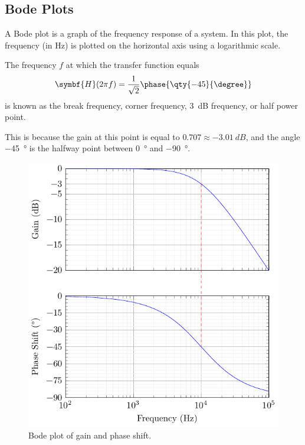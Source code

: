 \documentclass{article}
\begin{document}
\subsection{Bode Plots}
A Bode plot is a graph of the frequency response of a system.
In this plot, the frequency (in \unit{\hertz}) is plotted on the horizontal axis using a logarithmic scale.
\begin{definition}
    The frequency \(f\) at which the transfer function equals
    \begin{equation*}
        \symbf{H}(2\pi f) = \frac{1}{\sqrt{2}}\phase{\qty{-45}{\degree}}
    \end{equation*}
    is known as the break frequency, corner frequency,
    \qty{3}{dB} frequency, or half power point.

    This is because the gain at this point is equal to \(\num{0.707} \approx \qty{-3.01}{dB}\),
    and the angle \qty{-45}{\degree} is the halfway point between \qty{0}{\degree} and \qty{-90}{\degree}.
\end{definition}
\begin{figure}[H]
    \centering
    \includegraphics[width = \linewidth, keepaspectratio = true]{figures/bode_plot.pdf}
    \caption{Bode plot of gain and phase shift.}
\end{figure}
\newpage
\end{document}
